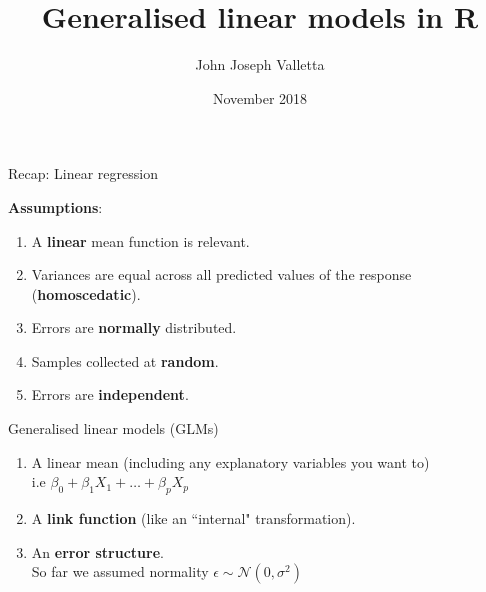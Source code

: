\documentclass[pdf]{beamer}
\title[GLMs in R]{Generalised linear models in R}
\author{John Joseph Valletta}
\date[November 2018]{November 2018}
\institute[]{University of Exeter, Penryn Campus, UK}
\begin{document}
\begin{frame}
\titlepage
\end{frame}

\begin{frame}{Recap: Linear regression}

\textbf{Assumptions}:

\begin{enumerate}\addtolength{\itemsep}{1\baselineskip}
    \item A \textbf{linear} mean function is relevant.
    \item Variances are equal across all predicted values of the response (\textbf{homoscedatic}).
    \item Errors are \textbf{normally} distributed. 
    \item Samples collected at \textbf{random}.
    \item Errors are \textbf{independent}.
\end{enumerate}

\end{frame}

\begin{frame}{Generalised linear models (GLMs)}

\begin{enumerate}\addtolength{\itemsep}{2\baselineskip}
    \item A linear mean (including any explanatory variables you want to)\\ i.e $\beta_0 + \beta_1X_1 + \ldots + \beta_pX_p$
    \item A \textbf{link function} (like an ``internal" transformation).
    \item An \textbf{error structure}.\\ So far we assumed normality $\epsilon \sim \mathcal{N}(0,\sigma^2)$
\end{enumerate}

\end{frame}
\end{document}
